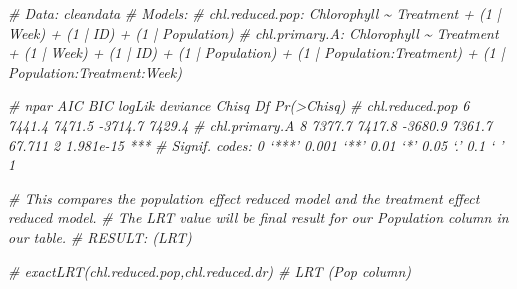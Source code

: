 \documentclass[
]{article}
\newenvironment{Shaded}{\begin{snugshade}}{\end{snugshade}}
\newcommand{\CommentTok}[1]{\textcolor[rgb]{0.56,0.35,0.01}{\textit{#1}}}
\begin{document}
\begin{Shaded}
\begin{Highlighting}[]
\CommentTok{\# Data: cleandata}
\CommentTok{\# Models:}
\CommentTok{\# chl.reduced.pop: Chlorophyll \textasciitilde{} Treatment + (1 | Week) + (1 | ID) + (1 | Population)}
\CommentTok{\# chl.primary.A: Chlorophyll \textasciitilde{} Treatment + (1 | Week) + (1 | ID) + (1 | Population) + (1 | Population:Treatment) + (1 | Population:Treatment:Week)}

                \CommentTok{\# npar    AIC    BIC  logLik deviance  Chisq Df Pr(\textgreater{}Chisq)    }
\CommentTok{\# chl.reduced.pop    6 7441.4 7471.5 {-}3714.7   7429.4                         }
\CommentTok{\# chl.primary.A      8 7377.7 7417.8 {-}3680.9   7361.7 67.711  2  1.981e{-}15 ***}
\CommentTok{\# Signif. codes:  0 ‘***’ 0.001 ‘**’ 0.01 ‘*’ 0.05 ‘.’ 0.1 ‘ ’ 1}
\end{Highlighting}
\end{Shaded}

\begin{Shaded}
\begin{Highlighting}[]
\CommentTok{\# This compares the population effect reduced model and the treatment effect reduced model.}
\CommentTok{\# The LRT value will be final result for our Population column in our table.}
\CommentTok{\# RESULT: (LRT) }

\CommentTok{\# exactLRT(chl.reduced.pop,chl.reduced.dr) \# LRT (Pop column)}
\end{Highlighting}
\end{Shaded}
\end{document}
